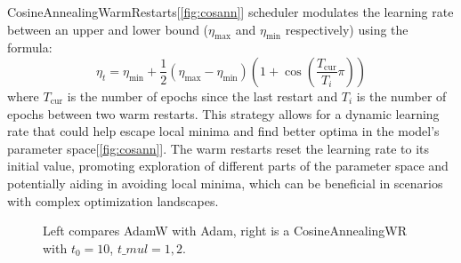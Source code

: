 \documentclass[10pt,twocolumn,letterpaper]{article}
\begin{document}
CosineAnnealingWarmRestarts\cite{loshchilov2016sgdr}[\ref{fig:cosann}] scheduler modulates the learning rate between an upper and lower bound (\(\eta_{\text{max}}\) and \(\eta_{\text{min}}\) respectively) using the formula\cite{loshchilov2016sgdr}:
\[ \eta_t = \eta_{\text{min}} + \frac{1}{2}(\eta_{\text{max}} - \eta_{\text{min}})(1 + \cos(\frac{T_{\text{cur}}}{T_i} \pi)) \]
where \( T_{\text{cur}} \) is the number of epochs since the last restart and \( T_i \) is the number of epochs between two warm restarts. This strategy allows for a dynamic learning rate that could help escape local minima and find better optima in the model's parameter space[\ref{fig:cosann}]. The warm restarts reset the learning rate to its initial value, promoting exploration of different parts of the parameter space and potentially aiding in avoiding local minima, which can be beneficial in scenarios with complex optimization landscapes.

\begin{figure}[h]
	\centering
	\caption{Left compares AdamW with Adam\cite{loshchilov2017decoupled, loshchilov2018fixing, kingma2014adam}, right is a CosineAnnealingWR with $t_0=10$, $t\_mul=1,2$.}
	\label{fig:opt}
\end{figure}
\end{document}
